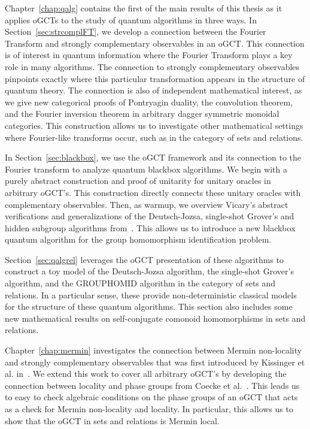 Chapter~\ref{chap:qalg} contains the first of the main results of this thesis as it applies oGCTs to the study of quantum algorithms in three ways.  In Section~\ref{sec:strcomplFT}, we develop a connection between the Fourier Transform and strongly complementary observables in an oGCT.  This connection is of interest in quantum information where the Fourier Transform plays a key role in many algorithms.  The connection to strongly complementary observables pinpoints exactly where this particular transformation appears in the structure of quantum theory.  The connection is also of independent mathematical interest, as we give new categorical proofs of Pontryagin duality, the convolution theorem, and the Fourier inversion theorem in arbitrary dagger symmetric monoidal categories. This construction allows us to investigate other mathematical settings where Fourier-like transforms occur, such as in the category of sets and relations.

In Section~\ref{sec:blackbox}, we use the oGCT framework and its connection to the Fourier transform to analyze quantum blackbox algorithms.  We begin with a purely abstract construction and proof of unitarity for unitary oracles in arbitrary oGCT's. This construction directly connects these unitary oracles with complementary observables. Then, as warmup, we overview Vicary's abstract verifications and generalizations  of the Deutsch-Jozsa, single-shot Grover's and hidden subgroup algorithms from~\cite{vicary-tqa}.  This allows us to introduce a new blackbox quantum algorithm for the group homomorphism identification problem. 

Section~\ref{sec:qalgrel} leverages the oGCT presentation of these algorithms to construct a toy model of the Deutsch-Jozsa algorithm, the single-shot Grover's algorithm, and the GROUPHOMID algorithm in the category of sets and relations. In a particular sense, these provide non-deterministic classical models for the structure of these quantum algorithms. This section also includes some new mathematical results on self-conjugate comonoid homomorphisms in sets and relations.

Chapter~\ref{chap:mermin} investigates the connection between Mermin non-locality and strongly complementary observables that was first introduced by Kissinger et al. in~\cite{coecke2012strong}. We extend this work to cover all arbitrary oGCT's by developing the connection between locality and phase groups from Coecke et al.~\cite{coecke2011phase}. This leads us to easy to check algebraic conditions on the phase groups of an oGCT that acts as a check for Mermin non-locality and locality. In particular, this allows us to show that the oGCT in sets and relations is Mermin local.

